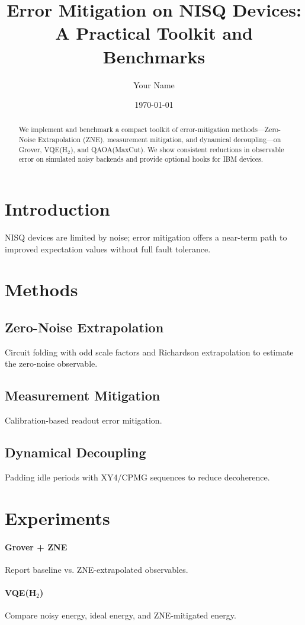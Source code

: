 \documentclass[11pt]{article}
\title{Error Mitigation on NISQ Devices: A Practical Toolkit and Benchmarks}
\author{Your Name}
\date{\today}
\begin{document}
\maketitle

\begin{abstract}
We implement and benchmark a compact toolkit of error-mitigation methods---Zero-Noise Extrapolation (ZNE), measurement mitigation, and dynamical decoupling---on Grover, VQE(H$_2$), and QAOA(MaxCut). We show consistent reductions in observable error on simulated noisy backends and provide optional hooks for IBM devices.
\end{abstract}

\section{Introduction}
NISQ devices are limited by noise; error mitigation offers a near-term path to improved expectation values without full fault tolerance.

\section{Methods}
\subsection{Zero-Noise Extrapolation}
Circuit folding with odd scale factors and Richardson extrapolation to estimate the zero-noise observable.

\subsection{Measurement Mitigation}
Calibration-based readout error mitigation.

\subsection{Dynamical Decoupling}
Padding idle periods with XY4/CPMG sequences to reduce decoherence.

\section{Experiments}
\paragraph{Grover + ZNE} Report baseline vs. ZNE-extrapolated observables.
\paragraph{VQE(H$_2$)} Compare noisy energy, ideal energy, and ZNE-mitigated energy.
\end{document}
